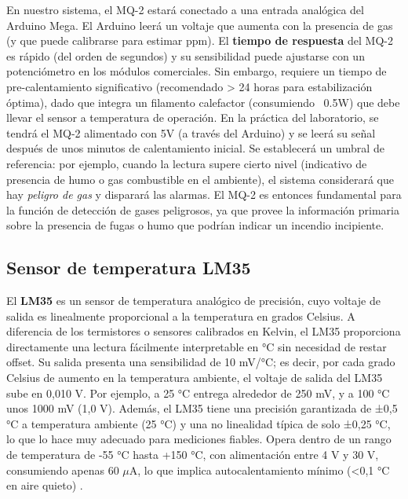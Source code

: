 En nuestro sistema, el MQ-2 estará conectado a una entrada analógica del Arduino Mega. El Arduino leerá un voltaje que aumenta con la presencia de gas (y que puede calibrarse para estimar ppm). El \textbf{tiempo de respuesta} del MQ-2 es rápido (del orden de segundos) y su sensibilidad puede ajustarse con un potenciómetro en los módulos comerciales. Sin embargo, requiere un tiempo de pre-calentamiento significativo (recomendado > 24 horas para estabilización óptima), dado que integra un filamento calefactor (consumiendo ~0.5W) que debe llevar el sensor a temperatura de operación. En la práctica del laboratorio, se tendrá el MQ-2 alimentado con 5V (a través del Arduino) y se leerá su señal después de unos minutos de calentamiento inicial. Se establecerá un umbral de referencia: por ejemplo, cuando la lectura supere cierto nivel (indicativo de presencia de humo o gas combustible en el ambiente), el sistema considerará que hay \textit{peligro de gas} y disparará las alarmas. El MQ-2 es entonces fundamental para la función de detección de gases peligrosos, ya que provee la información primaria sobre la presencia de fugas o humo que podrían indicar un incendio incipiente.

\subsection{Sensor de temperatura LM35}
El \textbf{LM35} es un sensor de temperatura analógico de precisión, cuyo voltaje de salida es linealmente proporcional a la temperatura en grados Celsius. A diferencia de los termistores o sensores calibrados en Kelvin, el LM35 proporciona directamente una lectura fácilmente interpretable en °C sin necesidad de restar offset. Su salida presenta una sensibilidad de 10 mV/°C; es decir, por cada grado Celsius de aumento en la temperatura ambiente, el voltaje de salida del LM35 sube en 0,010 V. Por ejemplo, a 25 °C entrega alrededor de 250 mV, y a 100 °C unos 1000 mV (1,0 V). Además, el LM35 tiene una precisión garantizada de ±0,5 °C a temperatura ambiente (25 °C) y una no linealidad típica de solo ±0,25 °C, lo que lo hace muy adecuado para mediciones fiables. Opera dentro de un rango de temperatura de -55 °C hasta +150 °C, con alimentación entre 4 V y 30 V, consumiendo apenas 60 $\mu$A, lo que implica autocalentamiento mínimo (<0,1 °C en aire quieto) \cite{lm35datasheet}.

